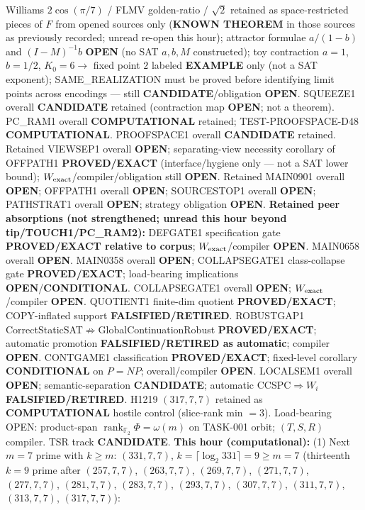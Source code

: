 \documentclass[11pt]{article}
\begin{document}
Williams $2\cos(\pi/7)$ / FLMV golden-ratio / $\sqrt{2}$ retained as space-restricted pieces of $F$ from opened sources only (\textbf{KNOWN THEOREM} in those sources as previously recorded; unread re-open this hour);
attractor formulae $a/(1-b)$ and $(I-M)^{-1}b$ \textbf{OPEN} (no SAT $a,b,M$ constructed);
toy contraction $a{=}1$, $b{=}1/2$, $K_0{=}6\to$ fixed point $2$ labeled \textbf{EXAMPLE} only (not a SAT exponent);
SAME\_REALIZATION must be proved before identifying limit points across encodings --- still \textbf{CANDIDATE}/obligation \textbf{OPEN}.
SQUEEZE1 overall \textbf{CANDIDATE} retained (contraction map \textbf{OPEN}; not a theorem).
PC\_RAM1 overall \textbf{COMPUTATIONAL} retained; TEST-PROOFSPACE-D48 \textbf{COMPUTATIONAL}.
PROOFSPACE1 overall \textbf{CANDIDATE} retained.
Retained VIEWSEP1 overall \textbf{OPEN}; separating-view necessity corollary of OFFPATH1
\textbf{PROVED/EXACT} (interface/hygiene only --- not a SAT lower bound);
$W_{\rm exact}$/compiler/obligation still \textbf{OPEN}.
Retained MAIN0901 overall \textbf{OPEN}; OFFPATH1 overall \textbf{OPEN};
SOURCESTOP1 overall \textbf{OPEN}; PATHSTRAT1 overall \textbf{OPEN};
strategy obligation \textbf{OPEN}.
\textbf{Retained peer absorptions (not strengthened; unread this hour beyond tip/TOUCH1/PC\_RAM2):}
DEFGATE1 specification gate \textbf{PROVED/EXACT relative to corpus};
$W_{\rm exact}$/compiler \textbf{OPEN}.
MAIN0658 overall \textbf{OPEN}.
MAIN0358 overall \textbf{OPEN}; COLLAPSEGATE1 class-collapse gate \textbf{PROVED/EXACT};
load-bearing implications \textbf{OPEN}/\textbf{CONDITIONAL}.
COLLAPSEGATE1 overall \textbf{OPEN}; $W_{\rm exact}$/compiler \textbf{OPEN}.
QUOTIENT1 finite-dim quotient \textbf{PROVED/EXACT}; COPY-inflated support \textbf{FALSIFIED/RETIRED}.
ROBUSTGAP1 CorrectStaticSAT$\not\Rightarrow$GlobalContinuationRobust \textbf{PROVED/EXACT};
automatic promotion \textbf{FALSIFIED/RETIRED as automatic}; compiler \textbf{OPEN}.
CONTGAME1 classification \textbf{PROVED/EXACT}; fixed-level corollary \textbf{CONDITIONAL} on $P=NP$;
overall/compiler \textbf{OPEN}.
LOCALSEM1 overall \textbf{OPEN}; semantic-separation \textbf{CANDIDATE}; automatic CCSPC$\Rightarrow W_i$
\textbf{FALSIFIED/RETIRED}.
H1219 $(317,7,7)$ retained as \textbf{COMPUTATIONAL} hostile control (slice-rank min $=3$).
Load-bearing OPEN: product-span $\operatorname{rank}_{\mathbb F_2}\Phi=\omega(m)$ on TASK-001 orbit;
$(T,S,R)$ compiler. TSR track \textbf{CANDIDATE}.
\textbf{This hour (computational):}
(1) Next $m{=}7$ prime with $k{\ge}m$: $(331,7,7)$, $k{=}\lceil\log_2 331\rceil=9{\ge}m{=}7$
(thirteenth $k{=}9$ prime after $(257,7,7)$, $(263,7,7)$, $(269,7,7)$, $(271,7,7)$, $(277,7,7)$, $(281,7,7)$, $(283,7,7)$, $(293,7,7)$, $(307,7,7)$, $(311,7,7)$, $(313,7,7)$, $(317,7,7)$):
\end{document}
